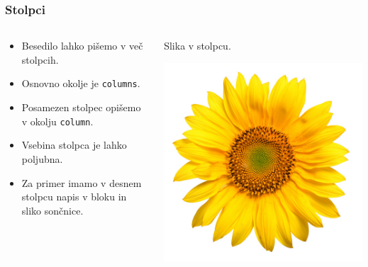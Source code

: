 \documentclass[11pt,hyperref={unicode}]{beamer}
\begin{document}
\begin{frame}
   \frametitle{Stolpci}
   \begin{columns}
      \begin{column}{0.5\textwidth}
         \begin{itemize}
            \item Besedilo lahko pišemo v več stolpcih.
            \item Osnovno okolje je \texttt{columns}.
            \item Posamezen stolpec opišemo v okolju \texttt{column}.
            \item Vsebina stolpca je lahko poljubna.
            \item Za primer imamo v desnem stolpcu napis v bloku in sliko 
            sončnice.
         \end{itemize}
      \end{column}
      \begin{column}{0.45\textwidth}
         \begin{center}
            \begin{exampleblock}{}
               \centering
               Slika v stolpcu.
            \end{exampleblock}
            \includegraphics{soncnica.jpg}
         \end{center}
      \end{column}
   \end{columns}
\end{frame}
\end{document}
